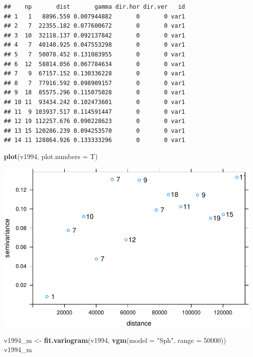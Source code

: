 \documentclass[11pt,]{article}
\newenvironment{Shaded}{\begin{snugshade}}{\end{snugshade}}
\newcommand{\KeywordTok}[1]{\textcolor[rgb]{0.13,0.29,0.53}{\textbf{#1}}}
\newcommand{\DataTypeTok}[1]{\textcolor[rgb]{0.13,0.29,0.53}{#1}}
\newcommand{\DecValTok}[1]{\textcolor[rgb]{0.00,0.00,0.81}{#1}}
\newcommand{\StringTok}[1]{\textcolor[rgb]{0.31,0.60,0.02}{#1}}
\newcommand{\NormalTok}[1]{#1}
\begin{document}
\begin{verbatim}
##    np       dist       gamma dir.hor dir.ver   id
## 1   1   8896.559 0.007944882       0       0 var1
## 2   7  22355.182 0.077600672       0       0 var1
## 3  10  32118.137 0.092137842       0       0 var1
## 4   7  40140.925 0.047553298       0       0 var1
## 5   7  50078.452 0.131083955       0       0 var1
## 6  12  58814.056 0.067784634       0       0 var1
## 7   9  67157.152 0.130336228       0       0 var1
## 8   7  77916.592 0.098909157       0       0 var1
## 9  18  85575.296 0.115075028       0       0 var1
## 10 11  93434.242 0.102473601       0       0 var1
## 11  9 103937.517 0.114591447       0       0 var1
## 12 19 112257.676 0.090228623       0       0 var1
## 13 15 120286.239 0.094253570       0       0 var1
## 14 11 128864.926 0.133333296       0       0 var1
\end{verbatim}

\begin{Shaded}
\begin{Highlighting}[]
\KeywordTok{plot}\NormalTok{(v1994, }\DataTypeTok{plot.numbers =}\NormalTok{ T)}
\end{Highlighting}
\end{Shaded}

\includegraphics{proyecto_files/figure-latex/unnamed-chunk-4-5.pdf}

\begin{Shaded}
\begin{Highlighting}[]
\NormalTok{v1994_m <-}\StringTok{ }\KeywordTok{fit.variogram}\NormalTok{(v1994, }\KeywordTok{vgm}\NormalTok{(}\DataTypeTok{model =} \StringTok{"Sph"}\NormalTok{, }\DataTypeTok{range =} \DecValTok{50000}\NormalTok{))}
\NormalTok{v1994_m}
\end{Highlighting}
\end{Shaded}
\end{document}
